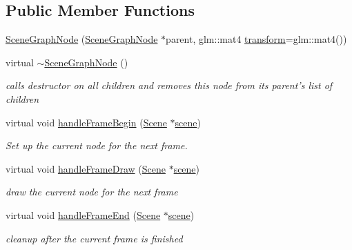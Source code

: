 \subsection*{Public Member Functions}
\begin{DoxyCompactItemize}
\item 
\hyperlink{classmotorcar_1_1SceneGraphNode_a293d96c3691afbaaba0da114a5e8f433}{Scene\-Graph\-Node} (\hyperlink{classmotorcar_1_1SceneGraphNode}{Scene\-Graph\-Node} $\ast$parent, glm\-::mat4 \hyperlink{classmotorcar_1_1SceneGraphNode_ad96e79fdd739ac8223a3128003be391a}{transform}=glm\-::mat4())
\item 
virtual \hyperlink{classmotorcar_1_1SceneGraphNode_ae81a28adc17e6be945c8279e4af4108c}{$\sim$\-Scene\-Graph\-Node} ()
\begin{DoxyCompactList}\small\item\em calls destructor on all children and removes this node from its parent's list of children \end{DoxyCompactList}\item 
virtual void \hyperlink{classmotorcar_1_1SceneGraphNode_a494eb20dd66a224888237af89ba6956f}{handle\-Frame\-Begin} (\hyperlink{classmotorcar_1_1Scene}{Scene} $\ast$\hyperlink{classmotorcar_1_1SceneGraphNode_aa14e637ed4ae98f77e28941a4b5cfdd8}{scene})
\begin{DoxyCompactList}\small\item\em Set up the current node for the next frame. \end{DoxyCompactList}\item 
virtual void \hyperlink{classmotorcar_1_1SceneGraphNode_a06f85abeee71ebe2b21ca9d6d20d7e67}{handle\-Frame\-Draw} (\hyperlink{classmotorcar_1_1Scene}{Scene} $\ast$\hyperlink{classmotorcar_1_1SceneGraphNode_aa14e637ed4ae98f77e28941a4b5cfdd8}{scene})
\begin{DoxyCompactList}\small\item\em draw the current node for the next frame \end{DoxyCompactList}\item 
virtual void \hyperlink{classmotorcar_1_1SceneGraphNode_a52e54b4a1ed66387b561157ccd780661}{handle\-Frame\-End} (\hyperlink{classmotorcar_1_1Scene}{Scene} $\ast$\hyperlink{classmotorcar_1_1SceneGraphNode_aa14e637ed4ae98f77e28941a4b5cfdd8}{scene})
\begin{DoxyCompactList}\small\item\em cleanup after the current frame is finished \end{DoxyCompactList}\item 

\end{DoxyCompactItemize}
